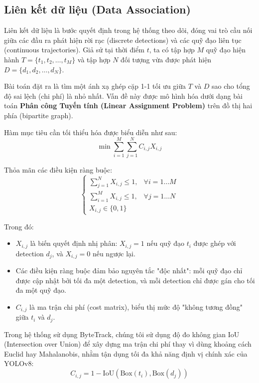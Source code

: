 \subsection{Liên kết dữ liệu (Data Association)}
Liên kết dữ liệu là bước quyết định trong hệ thống theo dõi, đóng vai trò cầu nối giữa các đầu ra phát hiện rời rạc (discrete detections) và các quỹ đạo liên tục (continuous trajectories). Giả sử tại thời điểm $t$, ta có tập hợp $M$ quỹ đạo hiện hành $T = \{t_1, t_2, \dots, t_M\}$ và tập hợp $N$ đối tượng vừa được phát hiện $D = \{d_1, d_2, \dots, d_N\}$.

Bài toán đặt ra là tìm một ánh xạ ghép cặp 1-1 tối ưu giữa $T$ và $D$ sao cho tổng độ sai lệch (chi phí) là nhỏ nhất. Vấn đề này được mô hình hóa dưới dạng bài toán \textbf{Phân công Tuyến tính (Linear Assignment Problem)} trên đồ thị hai phía (bipartite graph).

Hàm mục tiêu cần tối thiểu hóa được biểu diễn như sau:
\begin{equation}
    \min \sum_{i=1}^{M} \sum_{j=1}^{N} C_{i,j} X_{i,j}
\end{equation}

Thỏa mãn các điều kiện ràng buộc:
\begin{equation}
    \begin{cases}
        \sum_{j=1}^{N} X_{i,j} \le 1, & \forall i = 1 \dots M \\
        \sum_{i=1}^{M} X_{i,j} \le 1, & \forall j = 1 \dots N \\
        X_{i,j} \in \{0, 1\}
    \end{cases}
\end{equation}

Trong đó:
\begin{itemize}
    \item $X_{i,j}$ là biến quyết định nhị phân: $X_{i,j} = 1$ nếu quỹ đạo $t_i$ được ghép với detection $d_j$, và $X_{i,j} = 0$ nếu ngược lại.
    \item Các điều kiện ràng buộc đảm bảo nguyên tắc "độc nhất": mỗi quỹ đạo chỉ được cập nhật bởi tối đa một detection, và mỗi detection chỉ được gán cho tối đa một quỹ đạo.
    \item $C_{i,j}$ là ma trận chi phí (cost matrix), biểu thị mức độ "không tương đồng" giữa $t_i$ và $d_j$.
\end{itemize}

Trong hệ thống sử dụng ByteTrack, chúng tôi sử dụng độ đo không gian IoU (Intersection over Union) để xây dựng ma trận chi phí thay vì dùng khoảng cách Euclid hay Mahalanobis, nhằm tận dụng tối đa khả năng định vị chính xác của YOLOv8:
\begin{equation}
    C_{i,j} = 1 - \text{IoU}(\text{Box}(t_i), \text{Box}(d_j))
\end{equation}

